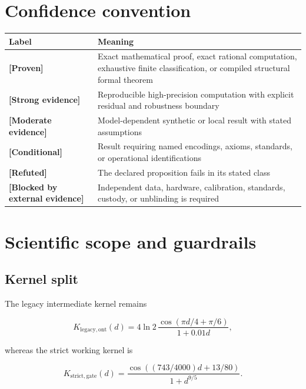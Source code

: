 \documentclass[11pt,a4paper,openany]{report}
\newcommand{\statusProven}{\textcolor{fingreen}{[Proven]}}
\newcommand{\statusStrong}{\textcolor{finblue}{[Strong evidence]}}
\newcommand{\statusModerate}{\textcolor{finviolet}{[Moderate evidence]}}
\newcommand{\statusRefuted}{\textcolor{finred}{[Refuted]}}
\begin{document}
\tableofcontents
\clearpage
{}

\chapter*{Confidence convention}

\begin{center}
\begingroup\small
\setlength{\tabcolsep}{2.5pt}
\renewcommand{\arraystretch}{1.16}
\begin{longtable}{@{}p{}p{}@{}}
\toprule
\textbf{Label} & \textbf{Meaning} \\
\midrule
\endhead
\textbf{\statusProven{}} & Exact mathematical proof, exact rational computation, exhaustive finite classification, or compiled structural formal theorem \\
\textbf{\statusStrong{}} & Reproducible high-precision computation with explicit residual and robustness boundary \\
\textbf{\statusModerate{}} & Model-dependent synthetic or local result with stated assumptions \\
\textbf{[Conditional]} & Result requiring named encodings, axioms, standards, or operational identifications \\
\textbf{\statusRefuted{}} & The declared proposition fails in its stated class \\
\textbf{[Blocked by external evidence]} & Independent data, hardware, calibration, standards, custody, or unblinding is required \\
\bottomrule
\end{longtable}
\endgroup
\end{center}

\chapter{Scientific scope and guardrails}

\section{Kernel split}

The legacy intermediate kernel remains

\[
K_{\mathrm{legacy,ont}}(d)=
4\ln2\,
\frac{\cos(\pi d/4+\pi/6)}{1+0.01d},
\]

whereas the strict working kernel is

\[
K_{\mathrm{strict,gate}}(d)=
\frac{\cos((743/4000)d+13/80)}{1+d^{9/5}}.
\]
\end{document}
